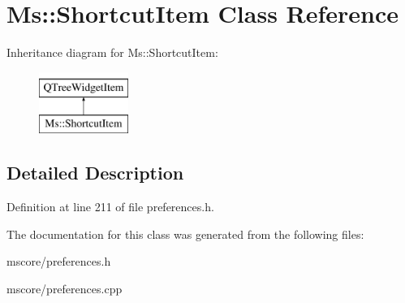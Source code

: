 \hypertarget{class_ms_1_1_shortcut_item}{}\section{Ms\+:\+:Shortcut\+Item Class Reference}
\label{class_ms_1_1_shortcut_item}
Inheritance diagram for Ms\+:\+:Shortcut\+Item\+:\begin{figure}[H]
\begin{center}
\leavevmode
\includegraphics[height=2.000000cm]{class_ms_1_1_shortcut_item}
\end{center}
\end{figure}


\subsection{Detailed Description}


Definition at line 211 of file preferences.\+h.



The documentation for this class was generated from the following files\+:\begin{DoxyCompactItemize}
\item 
mscore/preferences.\+h\item 
mscore/preferences.\+cpp\end{DoxyCompactItemize}
